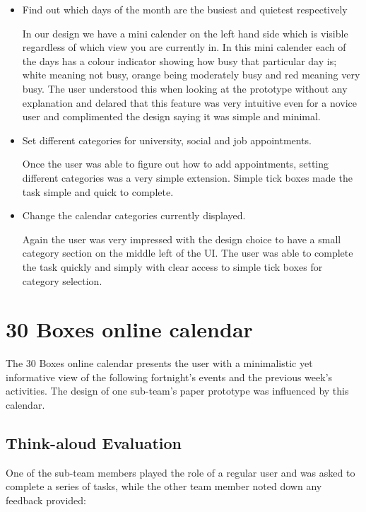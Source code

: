 \documentclass{article}
\begin{document}
\begin{itemize}
\item Find out which days of the month are the busiest and quietest
respectively

In our design we have a mini calender on the left hand side which is 
visible regardless of which view you are currently in. In this mini
calender each of the days has a colour indicator showing how busy that
particular day is; white meaning not busy, orange being moderately
busy and red meaning very busy. The user understood this when looking
at the prototype without any explanation and delared that this feature
was very intuitive even for a novice user and complimented the design
saying it was simple and minimal.

\item Set different categories for university, social and job
appointments.

Once the user was able to figure out how to add appointments, setting
different categories was a very simple extension. Simple tick boxes
made the task simple and quick to complete.

\item Change the calendar categories currently displayed.

Again the user was very impressed with the design choice to have a
small category section on the middle left of the UI. The user was able
to complete the task quickly and simply with clear access to simple
tick boxes for category selection. 

\end{itemize}


\section{30 Boxes online calendar}

The 30 Boxes online calendar presents the user with a minimalistic yet
informative view of the following fortnight's events and the previous
week's activities. The design of one sub-team's paper prototype was
influenced by this calendar. 

\subsection{Think-aloud Evaluation}

One of the sub-team members played the role of a regular user and was
asked to complete a series of tasks, while the other team member noted
down any feedback provided:
\end{document}
